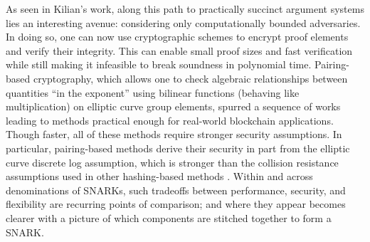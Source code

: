 \noindent As seen in Kilian's work, along this path to practically succinct argument systems lies an interesting avenue: considering only computationally bounded adversaries. In doing so, one can now use cryptographic schemes to encrypt proof elements and verify their integrity. This can enable small proof sizes and fast verification while still making it infeasible to break soundness in polynomial time. Pairing-based cryptography, which allows one to check algebraic relationships between quantities ``in the exponent'' using bilinear functions (behaving like multiplication) on elliptic curve group elements, spurred a sequence of works leading to methods practical enough for real-world blockchain applications. Though faster, all of these methods require stronger security assumptions. In particular, pairing-based methods derive their security in part from the elliptic curve discrete log assumption, which is stronger than the collision resistance assumptions used in other hashing-based methods \cite{starks, ligero, hyrax, aurora}. Within and across denominations of SNARKs, such tradeoffs between performance, security, and flexibility are recurring points of comparison; and where they appear becomes clearer with a picture of which components are stitched together to form a SNARK.


